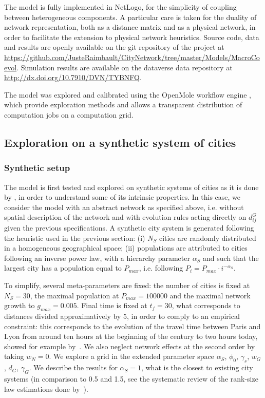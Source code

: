\documentclass[11pt]{article}
\begin{document}
The model is fully implemented in NetLogo, for the simplicity of coupling between heterogeneous components. A particular care is taken for the duality of network representation, both as a distance matrix and as a physical network, in order to facilitate the extension to physical network heuristics. Source code, data and results are openly available on the git repository of the project at \url{https://github.com/JusteRaimbault/CityNetwork/tree/master/Models/MacroCoevol}. Simulation results are available on the dataverse data repository at \url{http://dx.doi.org/10.7910/DVN/TYBNFQ}.

The model was explored and calibrated using the OpenMole workflow engine \citep{reuillon2013openmole}, which provide exploration methods and allows a transparent distribution of computation jobs on a computation grid.



\subsection{Exploration on a synthetic system of cities}

\subsubsection{Synthetic setup}

The model is first tested and explored on synthetic systems of cities as it is done by \cite{favaro2011gibrat}, in order to understand some of its intrinsic properties. In this case, we consider the model with an abstract network as specified above, i.e. without spatial description of the network and with evolution rules acting directly on $d^G_{ij}$ given the previous specifications. A synthetic city system is generated following the heuristic used in the previous section: (i) $N_S$ cities are randomly distributed in a homogeneous geographical space; (ii) populations are attributed to cities following an inverse power law, with a hierarchy parameter $\alpha_S$ and such that the largest city has a population equal to $P_{max}$, i.e. following $P_i = P_{max} \cdot i^{-\alpha_S}$.


To simplify, several meta-parameters are fixed: the number of cities is fixed at $N_S = 30$, the maximal population at $P_{max} = 100000$ and the maximal network growth to $g_{max} = 0.005$. Final time is fixed at $t_f = 30$, what corresponds to distances divided approximatively by 5, in order to comply to an empirical constraint: this corresponds to the evolution of the travel time between Paris and Lyon from around ten hours at the beginning of the century to two hours today, showed for example by~\cite{thevenin2013mapping}. We also neglect network effects at the second order by taking $w_N = 0$. We explore a grid in the extended parameter space $\alpha_S$, $\phi_0$, $\gamma_s$, $w_G$, $d_G$, $\gamma_G$. We describe the results for $\alpha_S = 1$, what is the closest to existing city systems (in comparison to 0.5 and 1.5, see the systematic review of the rank-size law estimations done by~\cite{10.1371/journal.pone.0183919}).
\end{document}
